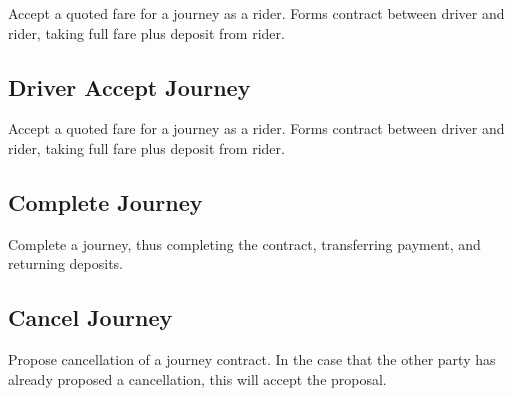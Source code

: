Accept a quoted fare for a journey as a rider. Forms contract between driver and rider, taking full fare plus deposit from rider.

\subsection{Driver Accept Journey}

Accept a quoted fare for a journey as a rider. Forms contract between driver and rider, taking full fare plus deposit from rider.

\subsection{Complete Journey}

Complete a journey, thus completing the contract, transferring payment, and returning deposits.

\subsection{Cancel Journey}

Propose cancellation of a journey contract. In the case that the other party has already proposed a cancellation, this will accept the proposal.